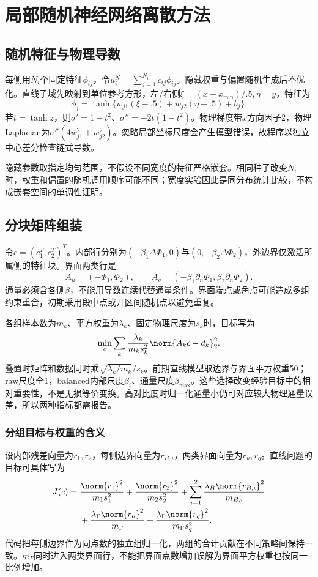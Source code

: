 \chapter{局部随机神经网络离散方法}
\section{随机特征与物理导数}
每侧用$N_i$个固定特征$\phi_{ij}$，令$u_i^N=\sum_{j=1}^{N_i}c_{ij}\phi_{ij}$。隐藏权重与偏置随机生成后不优化。直线子域先映射到单位参考方形，左/右侧$\xi=(x-x_{\min})/.5,\eta=y$，特征为
\begin{equation}
\phi_j=\tanh\{w_{j1}(\xi-.5)+w_{j2}(\eta-.5)+b_j\}.
\end{equation}
若$t=\tanh z$，则$\sigma'=1-t^2$、$\sigma''=-2t(1-t^2)$。物理梯度带$x$方向因子2，物理Laplacian为$\sigma''(4w_{j1}^2+w_{j2}^2)$。忽略局部坐标尺度会产生模型错误，故程序以独立中心差分检查链式导数。

隐藏参数取指定均匀范围，不假设不同宽度的特征严格嵌套。相同种子改变$N_i$时，权重和偏置的随机调用顺序可能不同；宽度实验因此是同分布统计比较，不构成嵌套空间的单调性证明。

\section{分块矩阵组装}
令$c=(c_1^T,c_2^T)^T$。内部行分别为$(-\beta_1\Delta\Phi_1,0)$与$(0,-\beta_2\Delta\Phi_2)$，外边界仅激活所属侧的特征块。界面两类行是
\begin{equation}
A_u=(-\Phi_1,\Phi_2),\qquad
A_q=(-\beta_1\partial_n\Phi_1,\beta_2\partial_n\Phi_2).
\end{equation}
通量必须含各侧$\beta$，不能用导数连续代替通量条件。界面端点或角点可能造成多组约束重合，初期采用段中点或开区间随机点以避免重复。

各组样本数为$m_k$、平方权重为$\lambda_k$、固定物理尺度为$s_k$时，目标写为
\begin{equation}\label{eq:weighted}
\min_c\sum_k\frac{\lambda_k}{m_ks_k^2}\norm{A_kc-d_k}_2^2.
\end{equation}
叠置时矩阵和数据同时乘$\sqrt{\lambda_k/m_k}/s_k$。前期直线模型取边界与界面平方权重50；raw尺度全1，balanced内部尺度$\beta_i$、通量尺度$\beta_{\max}$。这些选择改变经验目标中的相对重要性，不是无损等价变换。高对比度时归一化通量小仍可对应较大物理通量误差，所以两种指标都需报告。

\subsection{分组目标与权重的含义}
设内部残差向量为$r_1,r_2$，每侧边界向量为$r_{B,i}$，两类界面向量为$r_u,r_q$。直线问题的目标可具体写为
\begin{align}
J(c)={}&\frac{\norm{r_1}^2}{m_1s_1^2}+\frac{\norm{r_2}^2}{m_2s_2^2}
+\sum_{i=1}^2\frac{\lambda_B\norm{r_{B,i}}^2}{m_{B,i}}\nonumber\\
&+\frac{\lambda_\Gamma\norm{r_u}^2}{m_\Gamma}
+\frac{\lambda_\Gamma\norm{r_q}^2}{m_\Gamma s_q^2}.
\end{align}
代码把每侧边界作为同点数的独立组归一化，两组的合计贡献在不同策略间保持一致。$m_\Gamma$同时进入两类界面行，不能把界面点数增加误解为界面平方权重也按同一比例增加。

